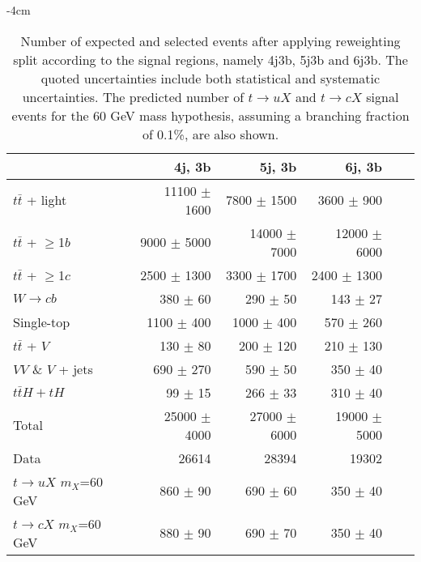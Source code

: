 \begin{table}[htb]
    \small
    \addtolength{\leftskip} {-4cm} %
    \addtolength{\rightskip}{-4cm}
    \centering
    \begin{tabular}{l r r r r r}
        \toprule\toprule
        & {4j, 3b} & {5j, 3b} & {6j, 3b} \\
        \midrule 
        $t\bar{t}$ + light        &  11100 $\pm$ 1600  & 7800  $\pm$ 1500  & 3600  $\pm$ 900  \\ 
        $t\bar{t}$ + $\geq$1$b$   &  9000  $\pm$ 5000  & 14000 $\pm$ 7000  & 12000 $\pm$ 6000 \\ 
        $t\bar{t}$ + $\geq$1$c$   &  2500  $\pm$ 1300  & 3300  $\pm$ 1700  & 2400  $\pm$ 1300 \\ 
        $W\rightarrow cb$         &  380   $\pm$ 60    & 290   $\pm$ 50    & 143   $\pm$ 27   \\ 
        Single-top                &  1100  $\pm$ 400   & 1000  $\pm$ 400   & 570   $\pm$ 260  \\ 
        $t\bar{t}$ + $V$          &  130   $\pm$ 80    & 200   $\pm$ 120   & 210   $\pm$ 130  \\ 
        $VV$ \& $V$ + jets        &  690   $\pm$ 270   & 590   $\pm$ 50    & 350   $\pm$ 40   \\ 
        $t\bar{t}H+tH$            &  99    $\pm$ 15    & 266   $\pm$ 33    & 310   $\pm$ 40   \\              
\midrule      
Total                     &  25000 $\pm$ 4000  & 27000 $\pm$ 6000  & 19000 $\pm$ 5000 \\
\midrule
Data                      & 26614             & 28394          & 19302          \\
\midrule  
$t\to uX$ $m_X$=60 GeV             &  860 $\pm$ 90      & 690 $\pm$ 60    & 350 $\pm$ 40     \\
$t\to cX$ $m_X$=60 GeV             &  880 $\pm$ 90      & 690 $\pm$ 70    & 350 $\pm$ 40     \\
\bottomrule\bottomrule                               
    \end{tabular}
    \caption{
    Number of expected and selected events after applying reweighting split according to the signal regions,
namely 4j3b, 5j3b and 6j3b. The quoted uncertainties include both statistical and systematic uncertainties. The
predicted number of $t\to uX$ and $t\to cX$ signal events for the 60 GeV mass hypothesis, assuming a branching
fraction of 0.1\%, are also shown.
    }
    \label{tqX:prefityields3b}
\end{table}

